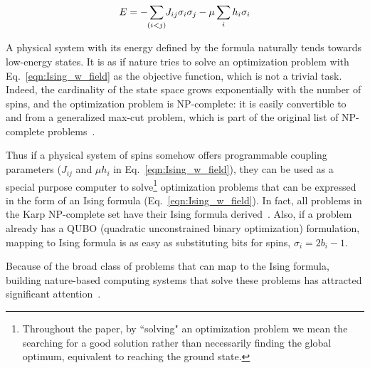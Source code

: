 \begin{equation}
\label{eqn:Ising_w_field}
E = -\sum_{\mathclap{(i<j)}} J_{ij}\sigma_i\sigma_j - \mu \sum_{\mathclap{i}} h_i\sigma_i
\end{equation}


A physical system with its energy defined by the formula naturally tends towards low-energy
states. It is as if nature tries to solve an optimization problem with
Eq.~\ref{eqn:Ising_w_field} as the objective function, which is not a trivial
task. Indeed, the cardinality of the state space grows exponentially with the
number of spins, and the optimization problem is NP-complete: it is easily
convertible to and from a generalized max-cut problem, which is part of the
original list of NP-complete problems~\cite{Karp1972}.

Thus if a physical system of spins somehow offers programmable coupling
parameters ($J_{ij}$ and $\mu h_i$ in Eq.~\ref{eqn:Ising_w_field}), they can
be used as a special purpose computer to solve\footnote{Throughout
the paper, by ``solving" an optimization problem we mean the
searching for a good solution rather than necessarily finding the global optimum, 
equivalent to reaching the ground state.} optimization problems that
can be expressed in the form of an Ising formula (Eq.~\ref{eqn:Ising_w_field}). In fact, all
problems in the Karp NP-complete set have their Ising formula
derived~\cite{lucas2014ising}. Also, if a problem already has a QUBO (quadratic
unconstrained binary optimization) formulation, mapping to Ising formula is as
easy as substituting bits for spins, \eg $\sigma_i = 2b_i-1$.

Because of the broad class of problems that can map to the Ising formula,
building nature-based computing systems that solve these problems has
attracted significant attention~\cite{kim2010quantum,berloff2017realizing,
barends2016digitized,yamaoka201520k,bunyk2014architectural,king2018observation,
bohm2019poor,hamerly2019towards,pierangeli2019large}.

